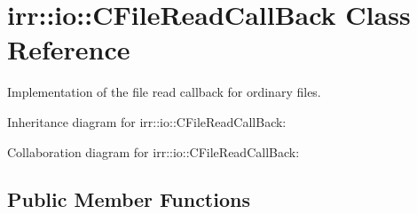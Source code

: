 \hypertarget{classirr_1_1io_1_1_c_file_read_call_back}{\section{irr\+:\+:io\+:\+:C\+File\+Read\+Call\+Back Class Reference}
\label{classirr_1_1io_1_1_c_file_read_call_back}
}


Implementation of the file read callback for ordinary files.  




Inheritance diagram for irr\+:\+:io\+:\+:C\+File\+Read\+Call\+Back\+:


Collaboration diagram for irr\+:\+:io\+:\+:C\+File\+Read\+Call\+Back\+:
\subsection*{Public Member Functions}
